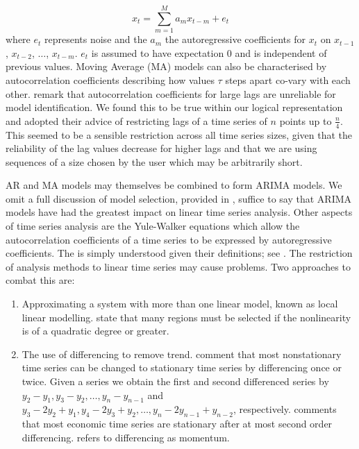 \begin{displaymath}
x_t = \sum_{m=1}^M a_m x_{t-m} + e_t
\end{displaymath}
where $e_t$ represents noise and the $a_m$ the autoregressive
coefficients for $x_t$ on $x_{t-1}$, $x_{t-2}$, $\ldots$, $x_{t-m}$. $e_t$
is assumed to have expectation 0 and is independent of previous
values. Moving Average (MA) models can also be characterised by
autocorrelation coefficients describing how values $\tau$ steps apart
co-vary with each other. \cite{ko90} remark that autocorrelation
coefficients for large lags are unreliable for model
identification. We found this to be true within our logical
representation and adopted their advice of restricting lags of a time
series of $n$ points up to $\frac{n}{4}$. This seemed to be a sensible
restriction across all time series sizes, given that the reliability
of the lag values decrease for higher lags and that we are using
sequences of a size chosen by the user which may be arbitrarily short.

\medskip

AR and MA models may themselves be combined to form ARIMA models.
We omit a full discussion of model selection,
provided in
\cite{ko90,end95}, suffice to say that ARIMA models have had the
greatest impact on linear time series analysis. Other aspects of time
series analysis are the Yule-Walker equations which allow the
autocorrelation coefficients of a time series to be expressed by
autoregressive coefficients. The is simply understood given their
definitions; see \cite{ko90}. The restriction of analysis methods to
linear time series may cause problems. Two approaches to combat this
are:
\begin{enumerate}
\item Approximating a system with more than one linear model, known as
local linear modelling. \cite{wg94} state that many regions must be
selected if the nonlinearity is of a quadratic degree or greater.
\item The use of differencing to remove trend. \cite{naze88,end95}
comment that most nonstationary time series can be changed to
stationary time series by differencing once or twice. Given a series
 we obtain the first and second differenced series by 
$y_2 - y_1, y_3 - y_2, \ldots, y_n - y_{n-1}$ and 
$y_3 - 2y_2 + y_1, y_4 - 2y_3 + y_2, \ldots, y_n - 2y_{n-1} +
y_{n-2}$, respectively. \cite{naze88} comments that most economic time
series are stationary after at most second order
differencing. \cite{raf99} refers to differencing as momentum.
\end{enumerate}

